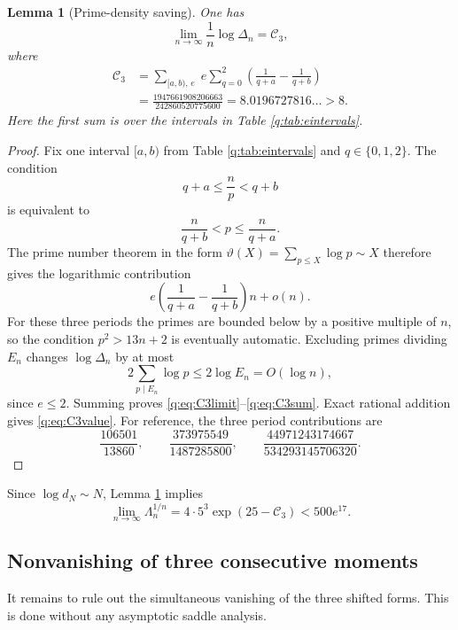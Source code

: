 \documentclass[11pt]{amsart}
\theoremstyle{plain}
\newtheorem{lemma}[theorem]{Lemma}
\theoremstyle{remark}\newtheorem{remark}[theorem]{Remark}
\numberwithin{equation}{section}
\begin{document}
\begin{lemma}[Prime-density saving]\label{q:lem:prime-density}
One has
\begin{equation}\label{q:eq:C3limit}
 \lim_{n\to\infty}\frac1n\log\Delta_n=\mathcal C_3,
\end{equation}
where
\begin{align}
 \mathcal C_3
 &=\sum_{[a,b),\,e}\;e\sum_{q=0}^{2}
   \left(\frac1{q+a}-\frac1{q+b}\right)\label{q:eq:C3sum}\\
 &=\frac{1947661908206663}{242860520775600}
  =8.0196727816\ldots>8.\label{q:eq:C3value}
\end{align}
Here the first sum is over the intervals in Table \ref{q:tab:eintervals}.
\end{lemma}

\begin{proof}
Fix one interval $[a,b)$ from Table \ref{q:tab:eintervals} and
$q\in\{0,1,2\}$.  The condition
\[
 q+a\le\frac np<q+b
\]
is equivalent to
\[
 \frac{n}{q+b}<p\le\frac{n}{q+a}.
\]
The prime number theorem in the form
$\vartheta(X)=\sum_{p\le X}\log p\sim X$ therefore gives the logarithmic
contribution
\[
 e\left(\frac1{q+a}-\frac1{q+b}\right)n+o(n).
\]
For these three periods the primes are bounded below by a positive multiple
of $n$, so the condition $p^2>13n+2$ is eventually automatic.  Excluding
primes dividing $E_n$ changes $\log\Delta_n$ by at most
\[
 2\sum_{p\mid E_n}\log p\le2\log E_n=O(\log n),
\]
since $e\le2$.  Summing proves \eqref{q:eq:C3limit}--\eqref{q:eq:C3sum}.
Exact rational addition gives \eqref{q:eq:C3value}.  For reference, the three
period contributions are
\[
 \frac{106501}{13860},\qquad
 \frac{373975549}{1487285800},\qquad
 \frac{44971243174667}{534293145706320}.
\]
\end{proof}

Since $\log d_N\sim N$, Lemma \ref{q:lem:prime-density} implies
\begin{equation}\label{q:eq:Lambda-root}
 \lim_{n\to\infty}\Lambda_n^{1/n}
 =4\cdot5^3\exp(25-\mathcal C_3)
 <500e^{17}.
\end{equation}

\subsection{Nonvanishing of three consecutive moments}\label{q:sec:nonvanishing}

It remains to rule out the simultaneous vanishing of the three shifted
forms.  This is done without any asymptotic saddle analysis.
\end{document}
